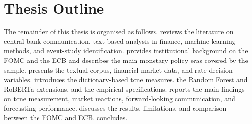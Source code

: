 \section{Thesis Outline}
\label{sec:intro_outline}
The remainder of this thesis is organised as follows.
 reviews the literature on central bank
communication, text-based analysis in finance, machine learning
methods, and event-study identification.
 provides institutional background on the
FOMC and the ECB and describes the main monetary policy eras covered
by the sample.  presents the textual corpus, financial
market data, and rate decision variables. 
introduces the dictionary-based tone measures, the Random Forest and
RoBERTa extensions, and the empirical specifications.
 reports the main findings on tone measurement,
market reactions, forward-looking communication, and forecasting
performance.  discusses the results, limitations,
and comparison between the FOMC and ECB. 
concludes.